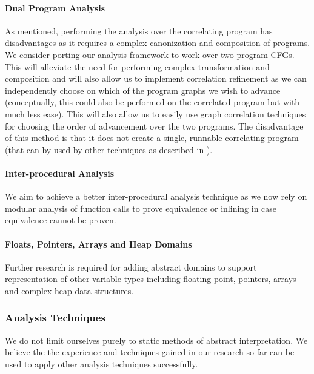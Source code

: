 \paragraph{Dual Program Analysis}
As mentioned, performing the analysis over the correlating program has disadvantages as it requires a complex canonization and composition of programs. We consider porting our analysis framework to work over two program CFGs. This will alleviate the need for performing complex transformation and composition and will also allow us to implement correlation refinement as we can independently choose on which of the program graphs we wish to advance (conceptually, this could also be performed on the correlated program but with much less ease). This will also allow us to easily use graph correlation techniques for choosing the order of advancement over the two programs. The disadvantage of this method is that it does not create a single, runnable correlating program (that can by used by other techniques as described in ).

\paragraph{Inter-procedural Analysis}
We aim to achieve a better inter-procedural analysis technique as we now rely on modular analysis of function calls to prove equivalence or inlining in case equivalence cannot be proven.

\paragraph{Floats, Pointers, Arrays and Heap Domains}
Further research is required for adding abstract domains to support representation of other variable types including floating point, pointers, arrays and complex heap data structures.


\subsubsection{Analysis Techniques}
We do not limit ourselves purely to static methods of abstract interpretation. We believe the the experience and techniques gained in our research so far can be used to apply other analysis techniques successfully.

